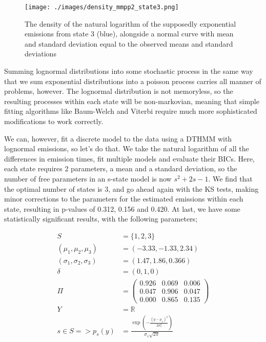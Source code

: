 \begin{figure}[h!]
\texttt{[image: ./images/density\_mmpp2\_state3.png]}
\caption{The density of the natural logarithm of the supposedly exponential emissions from state 3 (blue), alongside a normal curve with mean and standard deviation equal to the observed means and standard deviations}
\label{density_mmpp2_state3}
\end{figure}

\clearpage

Summing lognormal distributions into some stochastic process in the same way that we sum exponential distributions into a poisson process carries all manner of problems, however. The lognormal distribution is not memoryless, so the resulting processes within each state will be non-markovian, meaning that simple fitting algorithms like Baum-Welch and Viterbi require much more sophisticated modifications to work correctly.

We can, however, fit a discrete model to the data using a DTHMM with lognormal emissions, so let's do that. We take the natural logarithm of all the differences in emission times, fit multiple models and evaluate their BICs. Here, each state requires 2 parameters, a mean and a standard deviation, so the number of free parameters in an s-state model is now $s^2+2s-1$. We find that the optimal number of states is 3, and go ahead again with the KS tests, making minor corrections to the parameters for the estimated emissions within each state, resulting in p-values of 0.312, 0.156 and 0.420. At last, we have some statistically significant results, with the following parameters;

\begin{align*}
S &= \{1,2,3\}\\
(\mu_1, \mu_2, \mu_3) &= (-3.33, -1.33, 2.34)\\
(\sigma_1, \sigma_2, \sigma_3) &= (1.47, 1.86, 0.366)\\
\delta &= (0,1,0)\\
\Pi &= 
\left(
	\begin{matrix}
     0.926 & 0.069 & 0.006 \\
     0.047 & 0.906 & 0.047 \\
     0.000 & 0.865 & 0.135
	\end{matrix}
\right)\\
Y &= \mathbb{R}\\
s \in S => p_s(y) &= \frac{\exp({-\frac{(y-\mu_s)^2}{2\sigma_s^2}})}{\sigma_s\sqrt{2\pi}}
\end{align*}

